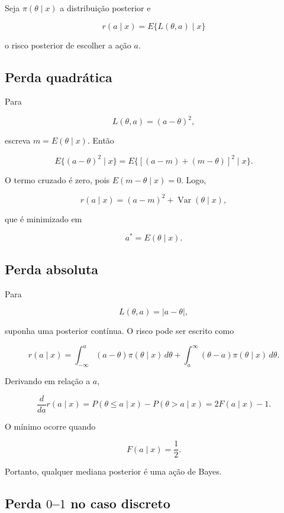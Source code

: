 \documentclass[
  letterpaper,
  DIV=11,
  numbers=noendperiod]{scrreprt}
\begin{document}

Seja \(\pi(\theta\mid x)\) a distribuição posterior e

\[
r(a\mid x)=E\{L(\theta,a)\mid x\}
\]

o risco posterior de escolher a ação \(a\).

\subsection*{Perda quadrática}\label{perda-quadruxe1tica}

Para

\[
L(\theta,a)=(a-\theta)^2,
\]

escreva \(m=E(\theta\mid x)\). Então

\[
E\{(a-\theta)^2\mid x\}
=
E\{[(a-m)+(m-\theta)]^2\mid x\}.
\]

O termo cruzado é zero, pois \(E(m-\theta\mid x)=0\). Logo,

\[
r(a\mid x)
=(a-m)^2+
\operatorname{Var}(\theta\mid x),
\]

que é minimizado em

\[
a^*=E(\theta\mid x).
\]

\subsection*{Perda absoluta}\label{perda-absoluta}

Para

\[
L(\theta,a)=|a-\theta|,
\]

suponha uma posterior contínua. O risco pode ser escrito como

\[
r(a\mid x)
=
\int_{-\infty}^a(a-\theta)\pi(\theta\mid x)\,d\theta
+
\int_a^\infty(\theta-a)\pi(\theta\mid x)\,d\theta.
\]

Derivando em relação a \(a\),

\[
\frac{d}{da}r(a\mid x)
=
P(\theta\leq a\mid x)-P(\theta>a\mid x)
=
2F(a\mid x)-1.
\]

O mínimo ocorre quando

\[
F(a\mid x)=\frac12.
\]

Portanto, qualquer mediana posterior é uma ação de Bayes.

\subsection*{\texorpdfstring{Perda \(0\)--\(1\) no caso
discreto}{Perda 0--1 no caso discreto}}\label{perda-01-no-caso-discreto}
\end{document}

